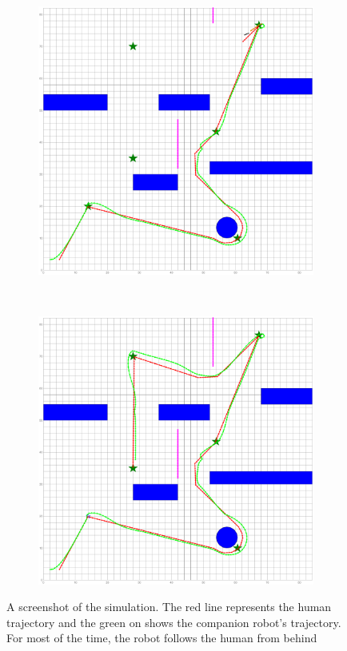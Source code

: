 \documentclass[letterpaper, 10 pt, conference]{ieeeconf}
\begin{document}
\begin{figure}
\begin{subfigure}{0.2\textwidth}
			\caption{}
			\label{fig:ref_traj_obs2}
		\end{subfigure}
		~
		\begin{subfigure}{0.2\textwidth}
			\includegraphics[width=\textwidth]{figures/sim_traj_obs2}
			\caption{}
			\label{fig:ref_traj_end}
		\end{subfigure}
		~
		\begin{subfigure}{0.2\textwidth}
			\includegraphics[width=\textwidth]{figures/sim_traj_end}
			\caption{}
			\label{fig:robot_accom}
		\end{subfigure}
		\caption{A screenshot of the simulation. The red line represents the human trajectory and the green on shows the companion robot's trajectory. For most of the time, the robot follows the human from behind}
	\end{figure}
	
\end{document}
